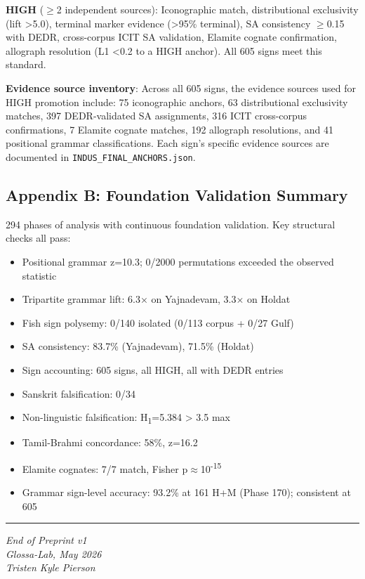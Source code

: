 \documentclass[
  11pt,
]{article}
\providecommand{\tightlist}{%
  \setlength{\itemsep}{0pt}\setlength{\parskip}{0pt}}
\begin{document}
\textbf{HIGH} ($\geq$2 independent sources): Iconographic match,
distributional exclusivity (lift \textgreater5.0), terminal marker
evidence (\textgreater95\% terminal), SA consistency $\geq$0.15 with DEDR,
cross-corpus ICIT SA validation, Elamite cognate confirmation,
allograph resolution (L1 \textless0.2 to a HIGH anchor). All 605 signs
meet this standard.

\textbf{Evidence source inventory}: Across all 605 signs, the evidence
sources used for HIGH promotion include: 75 iconographic anchors, 63
distributional exclusivity matches, 397 DEDR-validated SA assignments,
316 ICIT cross-corpus confirmations, 7 Elamite cognate matches,
192 allograph resolutions, and 41 positional grammar classifications.
Each sign's specific evidence sources are documented in
\texttt{INDUS\_FINAL\_ANCHORS.json}.

\subsection{Appendix B: Foundation Validation
Summary}\label{appendix-b-foundation-validation-summary}

294 phases of analysis with continuous foundation validation. Key
structural checks all pass:

\begin{itemize}
\tightlist
\item
  Positional grammar z=10.3; 0/2000 permutations exceeded the observed
  statistic
\item
  Tripartite grammar lift: 6.3× on Yajnadevam, 3.3× on Holdat
\item
  Fish sign polysemy: 0/140 isolated (0/113 corpus + 0/27 Gulf)
\item
  SA consistency: 83.7\% (Yajnadevam), 71.5\% (Holdat)
\item
  Sign accounting: 605 signs, all HIGH, all with DEDR entries
\item
  Sanskrit falsification: 0/34
\item
  Non-linguistic falsification: H\textsubscript{1}=5.384 \textgreater{}
  3.5 max
\item
  Tamil-Brahmi concordance: 58\%, z=16.2
\item
  Elamite cognates: 7/7 match, Fisher p$\approx$10\textsuperscript{-15}
\item
  Grammar sign-level accuracy: 93.2\% at 161 H+M (Phase 170); consistent
  at 605
\end{itemize}

\begin{center}\rule{0.5\linewidth}{0.5pt}\end{center}

\emph{End of Preprint v1}\\
\emph{Glossa-Lab, May 2026}\\
\emph{Tristen Kyle Pierson}
\end{document}
